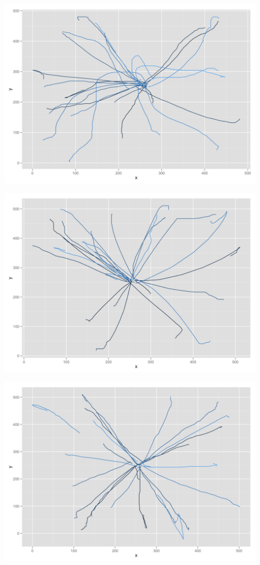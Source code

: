 \begin{appendices}
\begin{minipage}{\textwidth}
	\begin{minipage}{0.5\linewidth}
		\includegraphics[width=\linewidth]{images/plots/plot_analysis_qualitative_113}
	\end{minipage}
	\begin{minipage}{0.5\linewidth}
		\includegraphics[width=\linewidth]{images/plots/plot_analysis_qualitative_263}
	\end{minipage}
	\begin{minipage}{0.5\linewidth}
		\includegraphics[width=\linewidth]{images/plots/plot_analysis_qualitative_166}

\end{minipage}
\end{minipage}
\end{appendices}
